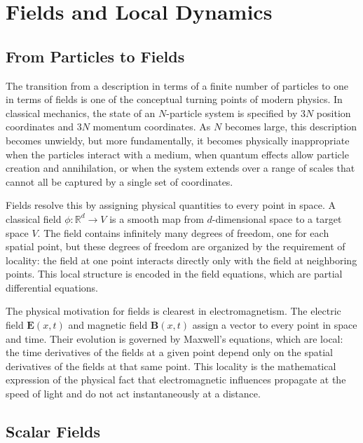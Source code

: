 \documentclass[11pt, twoside, openright]{book}
\theoremstyle{dotted}
\theoremstyle{definition}
\begin{document}
\chapter{Fields and Local Dynamics}
\label{ch:fields}

\section{From Particles to Fields}

The transition from a description in terms of a finite number of particles to one
in terms of fields is one of the conceptual turning points of modern physics. In
classical mechanics, the state of an $N$-particle system is specified by $3N$
position coordinates and $3N$ momentum coordinates. As $N$ becomes large, this
description becomes unwieldy, but more fundamentally, it becomes physically
inappropriate when the particles interact with a medium, when quantum effects
allow particle creation and annihilation, or when the system extends over a range
of scales that cannot all be captured by a single set of coordinates.

Fields resolve this by assigning physical quantities to every point in space. A
classical field $\phi: \mathbb{R}^d \to V$ is a smooth map from $d$-dimensional
space to a target space $V$. The field contains infinitely many degrees of freedom,
one for each spatial point, but these degrees of freedom are organized by the
requirement of locality: the field at one point interacts directly only with the
field at neighboring points. This local structure is encoded in the field equations,
which are partial differential equations.

The physical motivation for fields is clearest in electromagnetism. The electric
field $\mathbf{E}(x,t)$ and magnetic field $\mathbf{B}(x,t)$ assign a vector to
every point in space and time. Their evolution is governed by Maxwell's equations,
which are local: the time derivatives of the fields at a given point depend only
on the spatial derivatives of the fields at that same point. This locality is the
mathematical expression of the physical fact that electromagnetic influences
propagate at the speed of light and do not act instantaneously at a distance.

\section{Scalar Fields}
\end{document}
